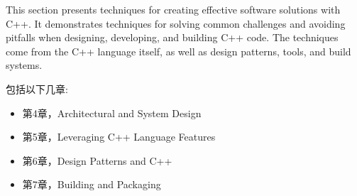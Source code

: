 
This section presents techniques for creating effective software solutions with C++. It demonstrates techniques for solving common challenges and avoiding pitfalls when designing, developing, and building C++ code. The techniques come from the C++ language itself, as well as design patterns, tools, and build systems.


包括以下几章:

\begin{itemize}
\item 第4章，Architectural and System Design
\item 第5章，Leveraging C++ Language Features
\item 第6章，Design Patterns and C++
\item 第7章，Building and Packaging
\end{itemize}